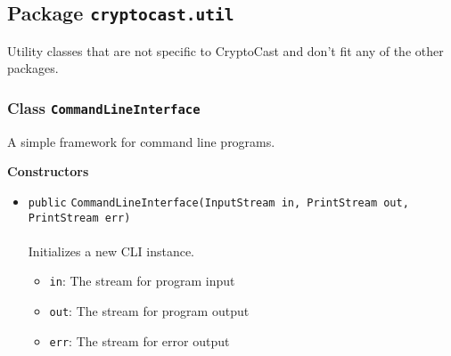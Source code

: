 \subsection{Package \lstinline!cryptocast.util!}
Utility classes that are not specific to CryptoCast and don't fit any of the other packages.

\subsubsection{Class \lstinline|CommandLineInterface|}
A simple framework for command line programs. \\
\noindent\begin{minipage}[t]{5cm}
\vspace{0.3em}
\hspace*{2em}
\vspace{0.3em}
\end{minipage}




\textbf{\sffamily Constructors}
\begin{itemize}
\item \lstinline|public| \lstinline|CommandLineInterface|\lstinline|(InputStream in, PrintStream out, PrintStream err)|\\ \\[-0.6em]
Initializes a new CLI instance.
\begin{itemize}
\item \lstinline|in|: The stream for program input
\item \lstinline|out|: The stream for program output
\item \lstinline|err|: The stream for error output
\end{itemize}



\end{itemize}


